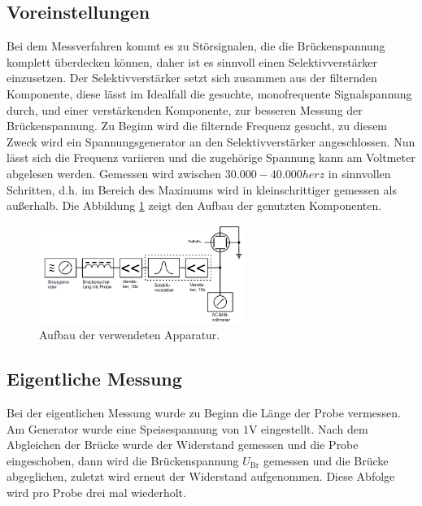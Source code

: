 \subsection{Voreinstellungen}
Bei dem Messverfahren kommt es zu Störsignalen, die  die Brückenspannung komplett überdecken können, daher ist es sinnvoll
einen Selektivverstärker einzusetzen. Der Selektivverstärker setzt sich zusammen aus der filternden Komponente, diese
lässt im Idealfall die gesuchte, monofrequente Signalspannung durch, und einer verstärkenden Komponente, zur besseren Messung
der Brückenspannung. Zu Beginn wird die filternde Frequenz gesucht, zu diesem Zweck wird ein Spannungsgenerator an den Selektivverstärker
angeschlossen. Nun lässt sich die Frequenz variieren und die zugehörige Spannung kann am Voltmeter abgelesen werden.
Gemessen wird zwischen $30.000-40.000 \si{herz}$ in sinnvollen Schritten, d.h. im Bereich des Maximums wird in kleinschrittiger gemessen
als außerhalb. Die Abbildung \ref{fig:sv} zeigt den Aufbau der genutzten Komponenten.
\begin{figure}
  \centering
  \includegraphics[width=0.6\textwidth]{Selektiv.PNG}
  \caption{Aufbau der verwendeten Apparatur.}
  \label{fig:sv}
\end{figure}


\subsection{Eigentliche Messung}
Bei der eigentlichen Messung wurde zu Beginn die Länge der Probe vermessen.
Am Generator wurde eine Speisespannung von $1\si{\volt}$ eingestellt.
Nach dem Abgleichen der Brücke wurde der Widerstand gemessen und die Probe eingeschoben, dann wird die Brückenspannung $U_\mathrm{Br}$
gemessen und die Brücke abgeglichen, zuletzt wird erneut der Widerstand aufgenommen. Diese Abfolge wird pro Probe drei mal wiederholt.
